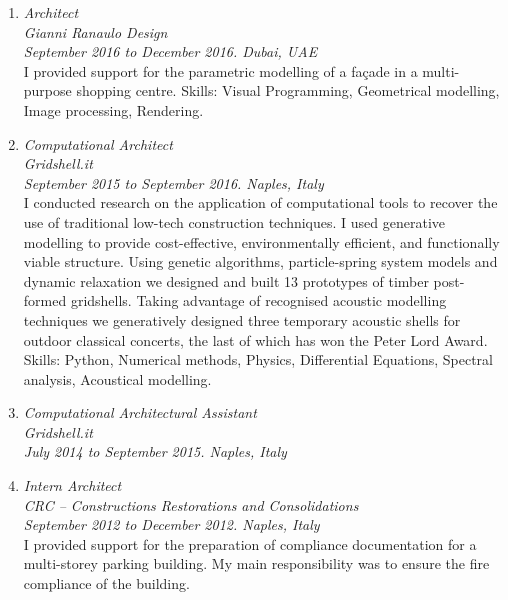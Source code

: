 \begin{enumerate}[leftmargin=0.45cm, itemsep=1em, topsep=0.5em, parsep=0.2em]
        \item
        \emph{Architect} \\
        \emph{Gianni Ranaulo Design} \\
        \textit{September 2016 to December 2016. Dubai, UAE} \vspace{0.2em} \\
        {I provided support for the parametric modelling of a façade in a multi-purpose shopping centre.}
        Skills: Visual Programming, Geometrical modelling, Image processing, Rendering.

        \item
        \emph{Computational Architect} \\
        \emph{Gridshell.it} \\
        \textit{September 2015 to September 2016. Naples, Italy} \vspace{0.2em} \\
        I conducted research on the application of computational tools to recover the use of traditional low-tech construction techniques. I used generative modelling to provide cost-effective, environmentally efficient, and functionally viable structure. Using genetic algorithms, particle-spring system models and dynamic relaxation we designed and built 13 prototypes of timber post-formed gridshells. Taking advantage of recognised acoustic modelling techniques we generatively designed three temporary acoustic shells for outdoor classical concerts, the last of which has won the Peter Lord Award.
        Skills: Python, Numerical methods, Physics, Differential Equations, Spectral analysis, Acoustical modelling.

        \item \emph{Computational Architectural Assistant} \\
        \emph{Gridshell.it} \\
        \textit{July 2014 to September 2015. Naples, Italy}

        \item \emph{Intern Architect} \\
        \emph{CRC – Constructions Restorations and Consolidations} \\
        \textit{September 2012 to December 2012. Naples, Italy} \vspace{0.2em} \\
        {I provided support for the preparation of compliance documentation for a multi-storey parking building. My main responsibility was to ensure the fire compliance of the building.}
    \end{enumerate}